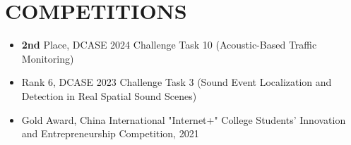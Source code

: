 \documentclass[a4paper,8pt]{article}
\begin{document}
\section{\textbf{COMPETITIONS}}

\begin{minipage}[t]{\linewidth}
    \begin{itemize}[nosep,after=\strut, leftmargin=1em, itemsep=2pt]
        \item \textbf{2nd} Place, DCASE 2024 Challenge Task 10 (Acoustic-Based Traffic Monitoring)
        \item Rank 6, DCASE 2023 Challenge Task 3 (Sound Event Localization and Detection in Real Spatial Sound Scenes)
        \item Gold Award, China International "Internet+" College Students' Innovation and Entrepreneurship Competition, 2021
        \\[4pt]
    \end{itemize}
\end{minipage}
\end{document}

